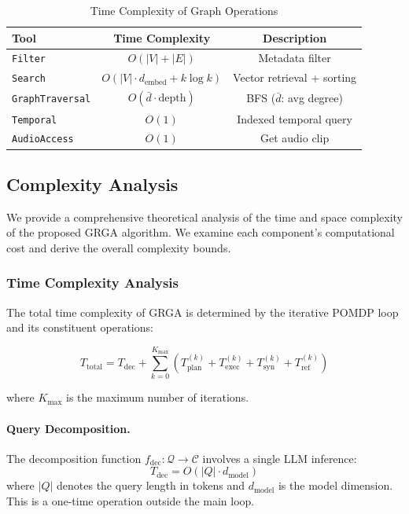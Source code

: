 \documentclass[11pt]{article}
\begin{document}
\begin{table}[hb]
\centering
\label{tab:tool_complexity}
\begin{tabular}{lcc}
\toprule
\textbf{Tool} & \textbf{Time Complexity} & \textbf{Description} \\
\midrule
\texttt{Filter} & $O(|V| + |E|)$ & Metadata filter \\
\texttt{Search} & $O(|V| \cdot d_{\text{embed}} + k \log k)$ & Vector retrieval + sorting \\
\texttt{GraphTraversal} & $O(\bar{d} \cdot \text{depth})$ & BFS ($\bar{d}$: avg degree) \\
\texttt{Temporal} & $O(1)$ & Indexed temporal query \\
\texttt{AudioAccess} & $O(1)$ & Get audio clip \\
\bottomrule
\end{tabular}
\caption{Time Complexity of Graph Operations}
\end{table}

\twocolumn

\subsection{Complexity Analysis}
We provide a comprehensive theoretical analysis of the time and space complexity of the proposed GRGA algorithm. We examine each component's computational cost and derive the overall complexity bounds.

\subsubsection{Time Complexity Analysis}

The total time complexity of GRGA is determined by the iterative POMDP loop and its constituent operations:

\begin{equation}
\label{eq:time_total}
T_{\text{total}} = T_{\text{dec}} + \sum_{k=0}^{K_{\max}} \left( T_{\text{plan}}^{(k)} + T_{\text{exec}}^{(k)} + T_{\text{syn}}^{(k)} + T_{\text{ref}}^{(k)} \right)
\end{equation}

where $K_{\max}$ is the maximum number of iterations.

\paragraph{Query Decomposition.}
The decomposition function $f_{\text{dec}}: \mathcal{Q} \to \mathcal{C}$ involves a single LLM inference:
\begin{equation}
T_{\text{dec}} = O(|Q| \cdot d_{\text{model}})
\end{equation}
where $|Q|$ denotes the query length in tokens and $d_{\text{model}}$ is the model dimension. This is a one-time operation outside the main loop.
\end{document}
